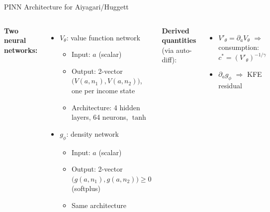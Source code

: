 \documentclass[aspectratio=169,11pt]{beamer}
\begin{document}
\begin{frame}{PINN Architecture for Aiyagari/Huggett}
\small
\begin{columns}[T]
\textbf{Two neural networks:}
\begin{itemize}\itemsep1pt
    \item $V_\theta$: value function network
    \begin{itemize}\itemsep0pt
        \item Input: $a$ (scalar)
        \item Output: 2-vector $\big(V(a,n_1),V(a,n_2)\big)$, one per income state
        \item Architecture: 4 hidden layers, 64 neurons, $\tanh$
    \end{itemize}
    \item $g_\phi$: density network
    \begin{itemize}\itemsep0pt
        \item Input: $a$ (scalar)
        \item Output: 2-vector $\big(g(a,n_1),g(a,n_2)\big) \geq 0$ (softplus)
        \item Same architecture
    \end{itemize}
\end{itemize}

\vspace{0.2em}
\textbf{Derived quantities} (via auto-diff):
\begin{itemize}\itemsep1pt
    \item $V'_\theta = \partial_a V_\theta$ \quad $\Rightarrow$ consumption: $c^* = (V'_\theta)^{-1/\gamma}$
    \item $\partial_a g_\phi$ \quad $\Rightarrow$ KFE residual
\end{itemize}

\begin{center}
\end{center}
\end{columns}
\end{frame}
\end{document}
